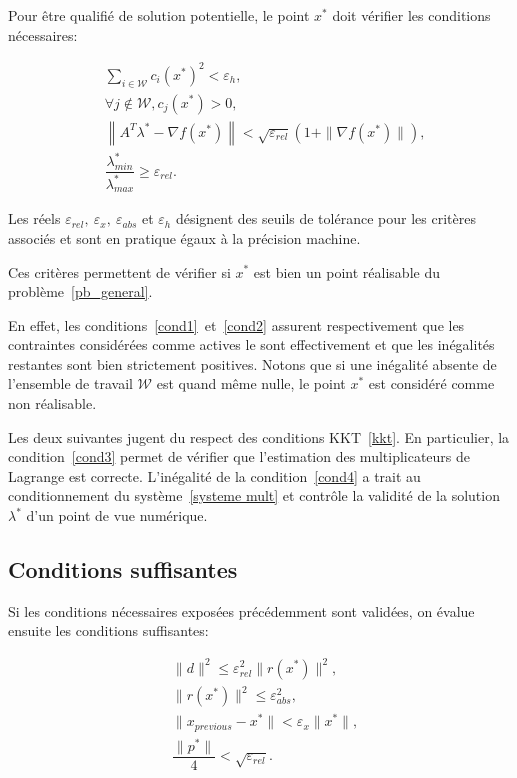 Pour être qualifié de solution potentielle, le point $x^*$ doit vérifier les conditions nécessaires:

\begin{align}
        & \sum_{i\in \mathcal{W}}c_i(x^*)^2 < \varepsilon_h,\label{cond1}\\
        & \forall j\notin\mathcal{W}, c_j(x^*) > 0,\label{cond2} \\
        & \left\|A^T\lambda^* - \nabla f(x^*)\right\| < \sqrt{\varepsilon_{rel}}\left(1+\|\nabla f(x^*)\|\right),\label{cond3} \\
        & \dfrac{\lambda_{min}^*}{\lambda_{max}^*}\geq \varepsilon_{rel}.\label{cond4}
\end{align}

Les réels $\varepsilon_{rel},\ \varepsilon_{x},\ \varepsilon_{abs}$ et $\varepsilon_{h}$ désignent des seuils de tolérance pour les critères associés et sont en pratique
égaux à la précision machine.

Ces critères permettent de vérifier si $x^*$ est bien un point réalisable du problème~\eqref{pb_general}. 

En effet, les conditions~\eqref{cond1}~et~\eqref{cond2} assurent respectivement que les contraintes considérées comme actives le sont effectivement et que les inégalités restantes sont bien strictement positives. 
Notons que si une inégalité absente de l'ensemble de travail $\mathcal{W}$ est quand même nulle, le point $x^*$ est considéré comme non réalisable.

Les deux suivantes jugent du respect des conditions KKT~\eqref{kkt}. En particulier, la condition~\eqref{cond3} permet de vérifier que l'estimation des multiplicateurs de Lagrange est correcte.
L'inégalité de la condition~\eqref{cond4} a trait au conditionnement du système~\eqref{systeme mult} et contrôle la validité de la solution $\lambda^*$ d'un point de vue numérique.

\subsection*{Conditions suffisantes}

Si les conditions nécessaires exposées précédemment sont validées, on évalue ensuite les conditions suffisantes: 

\begin{align}
        & \|d\|^2 \leq \varepsilon_{rel}^2 \|r(x^*)\|^2,\label{cond5} \\
        & \|r(x^*)\|^2 \leq \varepsilon_{abs}^2,\label{cond6}  \\
        & \|x_{previous} - x^*\| < \varepsilon_{x}\|x^*\|,\label{cond7}  \\
        & \dfrac{\|p^*\|}{4} < \sqrt{\varepsilon_{rel}}.\label{cond8} 
\end{align}


